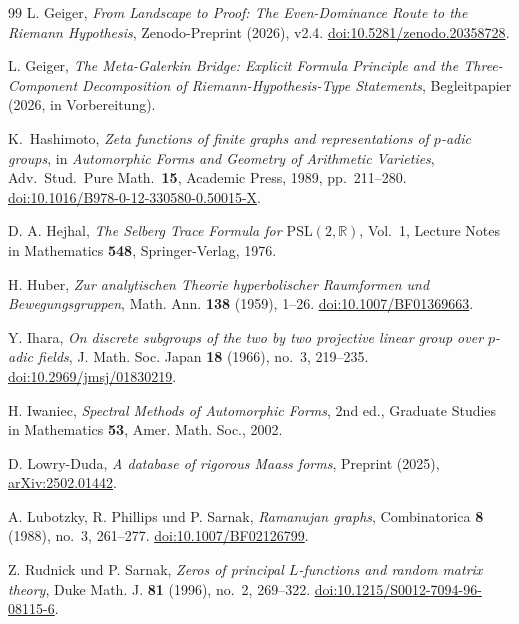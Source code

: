 \documentclass[12pt,a4paper]{article}
\theoremstyle{definition}
\theoremstyle{remark}
\newcommand{\RR}{\mathbb{R}}
\begin{document}
\begin{thebibliography}{99}
L. Geiger,
\emph{From Landscape to Proof: The Even-Dominance Route to the Riemann Hypothesis},
Zenodo-Preprint (2026), v2.4. \href{https://doi.org/10.5281/zenodo.20358728}{doi:10.5281/zenodo.20358728}.

L. Geiger,
\emph{The Meta-Galerkin Bridge: Explicit Formula Principle and the Three-Component Decomposition of Riemann-Hypothesis-Type Statements},
Begleitpapier (2026, in Vorbereitung).

K.\ Hashimoto,
\emph{Zeta functions of finite graphs and representations of $p$-adic groups},
in \emph{Automorphic Forms and Geometry of Arithmetic Varieties},
Adv.\ Stud.\ Pure Math.\ \textbf{15}, Academic Press, 1989, pp.~211--280.
\href{https://doi.org/10.1016/B978-0-12-330580-0.50015-X}{doi:10.1016/B978-0-12-330580-0.50015-X}.

D. A. Hejhal,
\emph{The Selberg Trace Formula for $\mathrm{PSL}(2,\RR)$}, Vol.~1,
Lecture Notes in Mathematics \textbf{548}, Springer-Verlag, 1976.

H. Huber,
\emph{Zur analytischen Theorie hyperbolischer Raumformen und Bewegungsgruppen},
Math. Ann. \textbf{138} (1959), 1--26.
\href{https://doi.org/10.1007/BF01369663}{doi:10.1007/BF01369663}.

Y. Ihara,
\emph{On discrete subgroups of the two by two projective linear group over $p$-adic fields},
J. Math. Soc. Japan \textbf{18} (1966), no.~3, 219--235.
\href{https://doi.org/10.2969/jmsj/01830219}{doi:10.2969/jmsj/01830219}.

H. Iwaniec,
\emph{Spectral Methods of Automorphic Forms},
2nd ed., Graduate Studies in Mathematics \textbf{53}, Amer. Math. Soc., 2002.

D. Lowry-Duda,
\emph{A database of rigorous Maass forms},
Preprint (2025), \href{https://arxiv.org/abs/2502.01442}{arXiv:2502.01442}.

A. Lubotzky, R. Phillips und P. Sarnak,
\emph{Ramanujan graphs},
Combinatorica \textbf{8} (1988), no.~3, 261--277.
\href{https://doi.org/10.1007/BF02126799}{doi:10.1007/BF02126799}.

Z. Rudnick und P. Sarnak,
\emph{Zeros of principal $L$-functions and random matrix theory},
Duke Math. J. \textbf{81} (1996), no.~2, 269--322.
\href{https://doi.org/10.1215/S0012-7094-96-08115-6}{doi:10.1215/S0012-7094-96-08115-6}.


\end{thebibliography}
\end{document}
